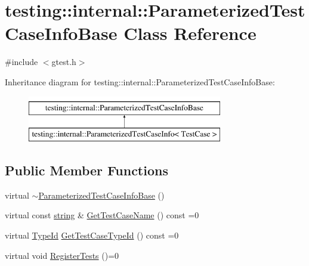 \hypertarget{classtesting_1_1internal_1_1_parameterized_test_case_info_base}{\section{testing\-:\-:internal\-:\-:Parameterized\-Test\-Case\-Info\-Base Class Reference}
\label{classtesting_1_1internal_1_1_parameterized_test_case_info_base}
}


{\ttfamily \#include $<$gtest.\-h$>$}

Inheritance diagram for testing\-:\-:internal\-:\-:Parameterized\-Test\-Case\-Info\-Base\-:\begin{figure}[H]
\begin{center}
\leavevmode
\includegraphics[height=2.000000cm]{classtesting_1_1internal_1_1_parameterized_test_case_info_base}
\end{center}
\end{figure}
\subsection*{Public Member Functions}
\begin{DoxyCompactItemize}
\item 
virtual \hyperlink{classtesting_1_1internal_1_1_parameterized_test_case_info_base_affae85e908f0901a8f0f1f9576843e35}{$\sim$\-Parameterized\-Test\-Case\-Info\-Base} ()
\item 
virtual const \hyperlink{namespacetesting_1_1internal_a5ca8a348395a6145775c1a2334e21889}{string} \& \hyperlink{classtesting_1_1internal_1_1_parameterized_test_case_info_base_a0c809cfb964cb9560d49ae830e2b6469}{Get\-Test\-Case\-Name} () const =0
\item 
virtual \hyperlink{namespacetesting_1_1internal_a38c435cbab5f8b784e2e7f3356cab242}{Type\-Id} \hyperlink{classtesting_1_1internal_1_1_parameterized_test_case_info_base_a932b4a9185a72d5bdfa5fd84fc06cbca}{Get\-Test\-Case\-Type\-Id} () const =0
\item 
virtual void \hyperlink{classtesting_1_1internal_1_1_parameterized_test_case_info_base_a92baca6c64c822c2e7043217f7903ef2}{Register\-Tests} ()=0
\end{DoxyCompactItemize}
